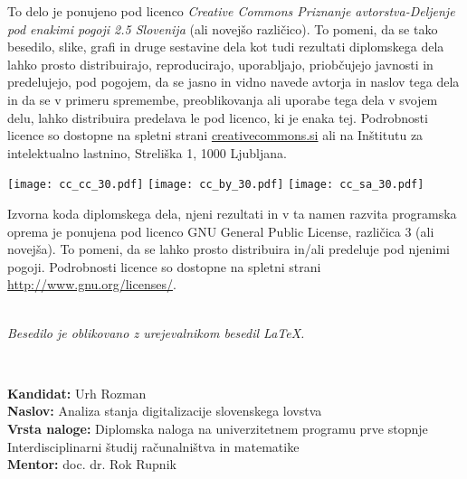 \documentclass[a4paper,12pt,openright]{book}
\newcommand{\clearemptydoublepage}{\newpage{\pagestyle{empty}\cleardoublepage}}
\newcommand{\CcImageCc}[1]{%
	\texttt{[image: cc\_cc\_30.pdf]}%
}
\newcommand{\CcImageBy}[1]{%
	\texttt{[image: cc\_by\_30.pdf]}%
}
\newcommand{\CcImageSa}[1]{%
	\texttt{[image: cc\_sa\_30.pdf]}%
}
\begin{document}
\newpage
\thispagestyle{empty}

\vspace*{5cm}
{\small \noindent
To delo je ponujeno pod licenco \textit{Creative Commons Priznanje avtorstva-Deljenje pod enakimi pogoji 2.5 Slovenija} (ali novej\v so razli\v cico).
To pomeni, da se tako besedilo, slike, grafi in druge sestavine dela kot tudi rezultati diplomskega dela lahko prosto distribuirajo,
reproducirajo, uporabljajo, priobčujejo javnosti in predelujejo, pod pogojem, da se jasno in vidno navede avtorja in naslov tega
dela in da se v primeru spremembe, preoblikovanja ali uporabe tega dela v svojem delu, lahko distribuira predelava le pod
licenco, ki je enaka tej.
Podrobnosti licence so dostopne na spletni strani \href{http://creativecommons.si}{creativecommons.si} ali na Inštitutu za
intelektualno lastnino, Streliška 1, 1000 Ljubljana.

\vspace*{1cm}
\begin{center}%
\CcImageCc{0.741573033707865}\hspace*{1ex}\CcImageBy{1}\hspace*{1ex}\CcImageSa{1}%
\end{center}
}

\vspace*{1cm}
{\small \noindent
Izvorna koda diplomskega dela, njeni rezultati in v ta namen razvita programska oprema je ponujena pod licenco GNU General Public License,
različica 3 (ali novejša). To pomeni, da se lahko prosto distribuira in/ali predeluje pod njenimi pogoji.
Podrobnosti licence so dostopne na spletni strani \url{http://www.gnu.org/licenses/}.
}

\vfill
\begin{center} 
\ \\ \vfill
{\em
Besedilo je oblikovano z urejevalnikom besedil \LaTeX.}
\end{center}

\clearemptydoublepage

\thispagestyle{empty}
\
\vfill

\bigskip
\noindent\textbf{Kandidat:} Urh Rozman\\
\noindent\textbf{Naslov:} Analiza stanja digitalizacije slovenskega lovstva\\
\noindent\textbf{Vrsta naloge:} Diplomska naloga na univerzitetnem programu prve stopnje Interdisciplinarni študij računalništva in matematike \\
\noindent\textbf{Mentor:} doc. dr. Rok Rupnik\\
\end{document}
